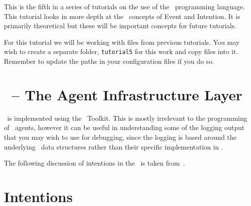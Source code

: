 This is the fifth in a series of tutorials on the use of the
\gwendolen\ programming language.  This tutorial looks in more depth
at the \gwendolen\ concepts of Event and Intention.  It is primarily
theoretical but these will be important concepts for future
tutorials. 

For this tutorial we will be working with files from previous
tutorials.  You may wish to create a separate folder,
\texttt{tutorial5} for this work and copy files into it.  Remember to
update the paths in your configuration files if you do so. 

\section{\ail\ -- The Agent Infrastructure Layer}

\gwendolen\ is implemented using the \ail\ Toolkit.  This
is mostly irrelevant to the programming of \gwendolen\ agents, however
it can be useful in understanding some of the logging
output that you may wish to use for
debugging,
since the logging is based around the underlying \java\ data
structures rather than their specific implementation in \gwendolen. 

\begin{sloppypar}
The following discussion of intentions in the \ail\ is taken
from~\cite{springerlink:10.1007/s10515-011-0088-x}. 
\end{sloppypar}

\section{Intentions}

